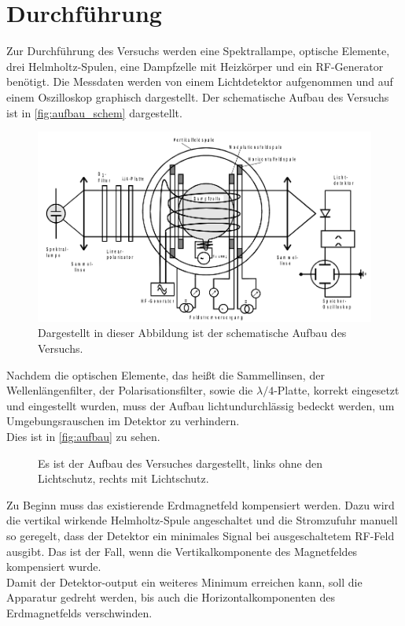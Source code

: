 \newpage
\section{Durchführung}
\label{sec:durchfuerung}

Zur Durchführung des Versuchs werden eine Spektrallampe, optische Elemente, drei Helmholtz-Spulen, eine Dampfzelle mit Heizkörper und ein RF-Generator benötigt.
Die Messdaten werden von einem Lichtdetektor aufgenommen und auf einem Oszilloskop graphisch dargestellt.
Der schematische Aufbau des Versuchs ist in \autoref{fig:aufbau_schem} dargestellt.

\begin{figure}[H]
    \centering
    \includegraphics[scale=0.4]{figures/aufbau_schem.png}
    \caption{Dargestellt in dieser Abbildung ist der schematische Aufbau des Versuchs.\cite{V21}}
    \label{fig:aufbau_schem}
\end{figure}

Nachdem die optischen Elemente, das heißt die Sammellinsen, der Wellenlängenfilter, der Polarisationsfilter, sowie die $\lambda/4$-Platte, korrekt eingesetzt und eingestellt wurden, muss der Aufbau lichtundurchlässig bedeckt werden, um Umgebungsrauschen im Detektor zu verhindern.\\
Dies ist in \autoref{fig:aufbau} zu sehen.

\begin{figure}[H]
    \centering
    \qquad
    \caption{Es ist der Aufbau des Versuches dargestellt, links ohne den Lichtschutz, rechts mit Lichtschutz.}
    \label{fig:aufbau}
\end{figure}

Zu Beginn muss das existierende Erdmagnetfeld kompensiert werden.
Dazu wird die vertikal wirkende Helmholtz-Spule angeschaltet und die Stromzufuhr manuell so geregelt, dass der Detektor ein minimales Signal bei ausgeschaltetem RF-Feld ausgibt.
Das ist der Fall, wenn die Vertikalkomponente des Magnetfeldes kompensiert wurde.\\
Damit der Detektor-output ein weiteres Minimum erreichen kann, soll die Apparatur gedreht werden, bis auch die Horizontalkomponenten des Erdmagnetfelds verschwinden.

